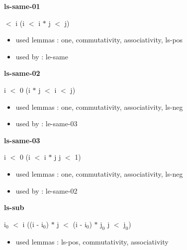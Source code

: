 \documentclass[a4paper]{article}
\begin{document}
\medskip

\bigskip

{\large\bf ls-same-01}

\medskip

  $<$ i \Imp (i $<$ i $*$ j  $<$ j)

\begin{itemize}


\item       used lemmas  : one, commutativity, associativity, ls-pos
\item       used by      : le-same

\end{itemize}

\medskip

\bigskip

{\large\bf ls-same-02}

\medskip

 \Fol i $<$ 0 \Imp (i $*$ j $<$ i  $<$ j)

\begin{itemize}


\item       used lemmas  : one, commutativity, associativity, ls-neg
\item       used by      : le-same-03

\end{itemize}

\medskip

\bigskip

{\large\bf ls-same-03}

\medskip

 \Fol i $<$ 0 \Imp (i $<$ i $*$ j \Equiv j $<$ 1)

\begin{itemize}


\item       used lemmas  : one, commutativity, associativity, ls-neg
\item       used by      : le-same-02

\end{itemize}

\medskip

\bigskip

{\large\bf ls-sub}

\medskip

 \Fol $\mbox{i}_{0}$ $<$ i \Imp ((i - $\mbox{i}_{0}$) $*$ j $<$ (i - $\mbox{i}_{0}$) $*$ $\mbox{j}_{0}$ \Equiv j $<$ $\mbox{j}_{0}$)

\begin{itemize}


\item       used lemmas  : ls-pos, commutativity, associativity

\end{itemize}
\end{document}
